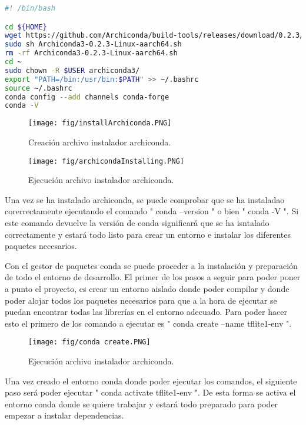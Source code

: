 \begin{lstlisting}[language=bash, caption={Código bash}, label={cod:bash}, captionpos=b]
#! /bin/bash

cd ${HOME}
wget https://github.com/Archiconda/build-tools/releases/download/0.2.3/Archiconda3-0.2.3-Linux-aarch64.sh
sudo sh Archiconda3-0.2.3-Linux-aarch64.sh
rm -rf Archiconda3-0.2.3-Linux-aarch64.sh
cd ~
sudo chown -R $USER archiconda3/
export "PATH=/bin:/usr/bin:$PATH" >> ~/.bashrc 
source ~/.bashrc
conda config --add channels conda-forge
conda -V

\end{lstlisting}

\begin{figure}[h]
    \centering
    \texttt{[image: fig/installArchiconda.PNG]}
    \caption{Creación archivo instalador archiconda.}
    \label{fig:mesh1}
\end{figure}

\begin{figure}[h]
    \centering
    \texttt{[image: fig/archicondaInstalling.PNG]}
    \caption{Ejecución archivo instalador archiconda.}
    \label{fig:mesh1}
\end{figure}

Una vez se ha instalado archiconda, se puede comprobar que se ha instaladao corerrectamente ejecutando el comando " conda --version " o bien " conda -V ". Si este comando devuelve la versión de conda significará que se ha isntalado correctamente y estará todo listo para crear un entorno e instalar los diferentes paquetes necesarios.

Con el gestor de paquetes conda se puede proceder a la instalación y preparación de todo el entorno de desarrollo. El primer de los pasos a seguir para poder poner a punto el proyecto, es crear un entorno aislado donde poder compilar y donde poder alojar todos los paquetes necesarios para que a la hora de ejecutar se puedan encontrar todas las librerías en el entorno adecuado. Para poder hacer esto el primero de los comando a ejecutar es " conda create --name tflite1-env ".
 
 \begin{figure}[h]
    \centering
    \texttt{[image: fig/conda create.PNG]}
    \caption{Ejecución archivo instalador archiconda.}
    \label{fig:mesh1}
\end{figure}

Una vez creado el entorno conda donde poder ejecutar los comandos, el siguiente paso será poder ejecutar " conda activate tflite1-env ". De esta forma se activa el entorno conda donde se quiere trabajar y estará todo preparado para poder empezar a instalar dependencias.

